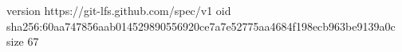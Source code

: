 version https://git-lfs.github.com/spec/v1
oid sha256:60aa747856aab014529890556920ce7a7e52775aa4684f198ecb963be9139a0c
size 67
